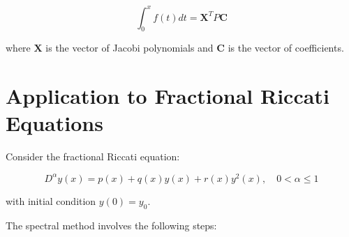 \documentclass{article}
\begin{document}
\begin{equation}
\int_0^x f(t)dt = \mathbf{X}^T P \mathbf{C}
\end{equation}

where $\mathbf{X}$ is the vector of Jacobi polynomials and $\mathbf{C}$ is the vector of coefficients.

\section{Application to Fractional Riccati Equations}
Consider the fractional Riccati equation:

\begin{equation}
D^\alpha y(x) = p(x) + q(x)y(x) + r(x)y^2(x), \quad 0 < \alpha \leq 1
\end{equation}

with initial condition $y(0) = y_0$.

The spectral method involves the following steps:
\end{document}
